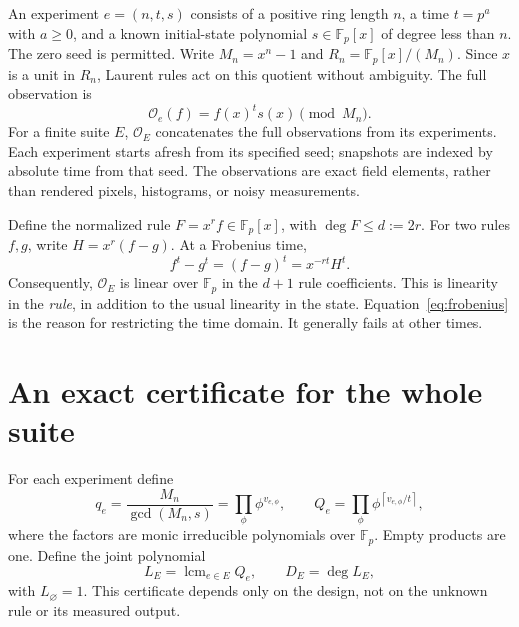\documentclass[11pt]{article}
\newcommand{\Fp}{\mathbb F_p}
\newcommand{\Obs}{\mathcal O}
\newcommand{\lcmop}{\operatorname{lcm}}
\newcommand{\ceil}[1]{\left\lceil #1\right\rceil}
\begin{document}
An experiment $e=(n,t,s)$ consists of a positive ring length $n$, a time $t=p^a$ with $a\geq0$, and a known initial-state polynomial $s\in\Fp[x]$ of degree less than $n$. The zero seed is permitted. Write $M_n=x^n-1$ and $R_n=\Fp[x]/(M_n)$. Since $x$ is a unit in $R_n$, Laurent rules act on this quotient without ambiguity. The full observation is
\begin{equation}
 \Obs_e(f)=f(x)^t s(x)\pmod{M_n}.
 \label{eq:obs}
\end{equation}
For a finite suite $E$, $\Obs_E$ concatenates the full observations from its experiments. Each experiment starts afresh from its specified seed; snapshots are indexed by absolute time from that seed. The observations are exact field elements, rather than rendered pixels, histograms, or noisy measurements.

Define the normalized rule $F=x^rf\in\Fp[x]$, with $\deg F\leq d:=2r$. For two rules $f,g$, write $H=x^r(f-g)$. At a Frobenius time,
\begin{equation}
 f^t-g^t=(f-g)^t=x^{-rt}H^t.
 \label{eq:frobenius}
\end{equation}
Consequently, $\Obs_E$ is linear over $\Fp$ in the $d+1$ rule coefficients. This is linearity in the \emph{rule}, in addition to the usual linearity in the state. Equation~\eqref{eq:frobenius} is the reason for restricting the time domain. It generally fails at other times.

\section{An exact certificate for the whole suite}
For each experiment define
\begin{equation}
 q_e=\frac{M_n}{\gcd(M_n,s)}=\prod_{\phi}\phi^{v_{e,\phi}},
 \qquad
 Q_e=\prod_{\phi}\phi^{\ceil{v_{e,\phi}/t}},
 \label{eq:Q}
\end{equation}
where the factors are monic irreducible polynomials over $\Fp$. Empty products are one. Define the joint polynomial
\begin{equation}
 L_E=\lcmop_{e\in E}Q_e,\qquad D_E=\deg L_E,
 \label{eq:L}
\end{equation}
with $L_\varnothing=1$. This certificate depends only on the design, not on the unknown rule or its measured output.
\end{document}
